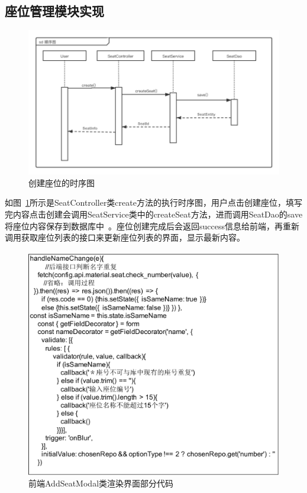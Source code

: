 \subsection{座位管理模块实现}
\begin{figure}[htbp!]
    \centering
    \includegraphics[width=\linewidth]{FIGs/chapter4/seat_time.pdf}
    \caption{创建座位的时序图}\label{fig_seat_time}
\end{figure}

如图~\ref{fig_seat_time}所示是SeatController类create方法的执行时序图，用户点击创建座位，填写完内容点击创建会调用SeatService类中的createSeat方法，进而调用SeatDao的save将座位内容保存到数据库中~\cite{jzh2019}。座位创建完成后会返回success信息给前端，再重新调用获取座位列表的接口来更新座位列表的界面，显示最新内容。

\begin{figure}[htbp!]
    \centering
    \includegraphics[width=5in]{FIGs/chapter4/8.pdf}
    \caption{前端AddSeatModal类渲染界面部分代码}\label{fig_seat_8}
\end{figure}

